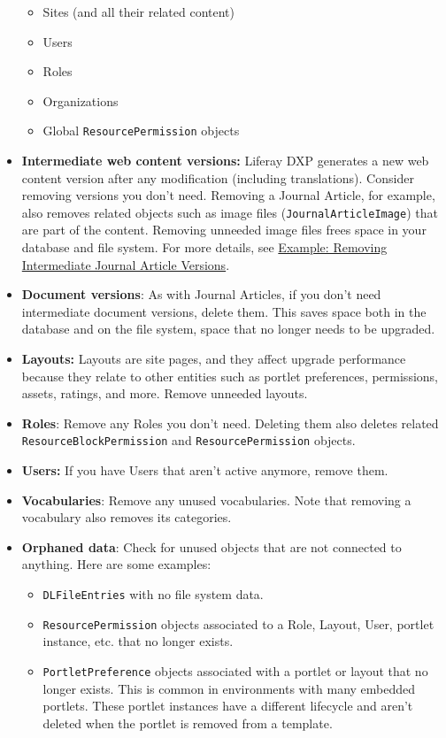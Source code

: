 \begin{itemize}
  \begin{itemize}
  \item
    Sites (and all their related content)
  \item
    Users
  \item
    Roles
  \item
    Organizations
  \item
    Global \texttt{ResourcePermission} objects
  \end{itemize}
\item
  \textbf{Intermediate web content versions:} Liferay DXP generates a
  new web content version after any modification (including
  translations). Consider removing versions you don't need. Removing a
  Journal Article, for example, also removes related objects such as
  image files (\texttt{JournalArticleImage}) that are part of the
  content. Removing unneeded image files frees space in your database
  and file system. For more details, see
  \href{/docs/7-2/deploy/-/knowledge_base/d/example-removing-intermediate-journal-article-versions}{Example:
  Removing Intermediate Journal Article Versions}.
\item
  \textbf{Document versions}: As with Journal Articles, if you don't
  need intermediate document versions, delete them. This saves space
  both in the database and on the file system, space that no longer
  needs to be upgraded.
\item
  \textbf{Layouts:} Layouts are site pages, and they affect upgrade
  performance because they relate to other entities such as portlet
  preferences, permissions, assets, ratings, and more. Remove unneeded
  layouts.
\item
  \textbf{Roles}: Remove any Roles you don't need. Deleting them also
  deletes related \texttt{ResourceBlockPermission} and
  \texttt{ResourcePermission} objects.
\item
  \textbf{Users:} If you have Users that aren't active anymore, remove
  them.
\item
  \textbf{Vocabularies}: Remove any unused vocabularies. Note that
  removing a vocabulary also removes its categories.
\item
  \textbf{Orphaned data}: Check for unused objects that are not
  connected to anything. Here are some examples:

  \begin{itemize}
  \item
    \texttt{DLFileEntries} with no file system data.
  \item
    \texttt{ResourcePermission} objects associated to a Role, Layout,
    User, portlet instance, etc. that no longer exists.
  \item
    \texttt{PortletPreference} objects associated with a portlet or
    layout that no longer exists. This is common in environments with
    many embedded portlets. These portlet instances have a different
    lifecycle and aren't deleted when the portlet is removed from a
    template.
  \end{itemize}
\end{itemize}

